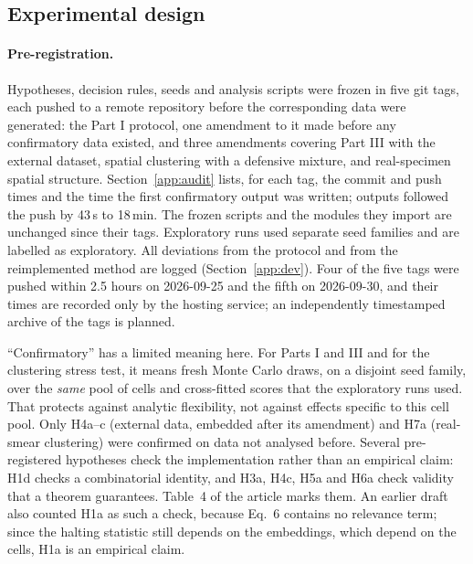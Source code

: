 \documentclass[11pt]{article}
\theoremstyle{remark}
\theoremstyle{definition}
\begin{document}
\subsection{Experimental design}\label{sec:design}
\paragraph{Pre-registration.} Hypotheses, decision rules, seeds and analysis scripts were frozen in five git tags, each pushed to a remote repository before the corresponding data were generated: the Part I protocol, one amendment to it made before any confirmatory data existed, and three amendments covering Part III with the external dataset, spatial clustering with a defensive mixture, and real-specimen spatial structure. Section~\ref{app:audit} lists, for each tag, the commit and push times and the time the first confirmatory output was written; outputs followed the push by 43\,s to 18\,min. The frozen scripts and the modules they import are unchanged since their tags. Exploratory runs used separate seed families and are labelled as exploratory. All deviations from the protocol and from the reimplemented method are logged (Section~\ref{app:dev}). Four of the five tags were pushed within 2.5 hours on 2026-09-25 and the fifth on 2026-09-30, and their times are recorded only by the hosting service; an independently timestamped archive of the tags is planned.

``Confirmatory'' has a limited meaning here. For Parts I and III and for the clustering stress test, it means fresh Monte Carlo draws, on a disjoint seed family, over the \emph{same} pool of cells and cross-fitted scores that the exploratory runs used. That protects against analytic flexibility, not against effects specific to this cell pool. Only H4a--c (external data, embedded after its amendment) and H7a (real-smear clustering) were confirmed on data not analysed before. Several pre-registered hypotheses check the implementation rather than an empirical claim: H1d checks a combinatorial identity, and H3a, H4c, H5a and H6a check validity that a theorem guarantees. Table~4 of the article marks them. An earlier draft also counted H1a as such a check, because Eq.~6 contains no relevance term; since the halting statistic still depends on the embeddings, which depend on the cells, H1a is an empirical claim.
\end{document}
